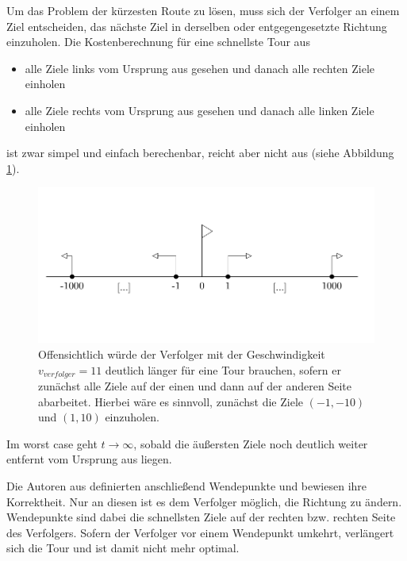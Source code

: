 \documentclass[german,version-2019-11]{uzl-thesis}
\begin{document}
Um das Problem der kürzesten Route zu lösen, muss sich der Verfolger an einem Ziel entscheiden, das nächste Ziel in derselben oder entgegengesetzte Richtung einzuholen. Die Kostenberechnung für eine schnellste Tour aus
\begin{itemize}
\item alle Ziele links vom Ursprung aus gesehen und danach alle rechten Ziele einholen
\item alle Ziele rechts vom Ursprung aus gesehen und danach alle linken Ziele einholen
\end{itemize} 
ist zwar simpel und einfach berechenbar, reicht aber nicht aus (siehe Abbildung \ref{fig:GegenBsp1Dim}).
\begin{figure}[htbp]
\centering
\includegraphics[scale=0.68]{../Grafiken/Verwendete/1DGegenbsp.PNG}
\caption{Offensichtlich würde der Verfolger mit der Geschwindigkeit $v_{verfolger}=11$ deutlich länger für eine Tour brauchen, sofern er zunächst alle Ziele auf der einen und dann auf der anderen Seite abarbeitet. Hierbei wäre es sinnvoll, zunächst die Ziele $(-1,-10)$ und $(1,10)$ einzuholen.}
\label{fig:GegenBsp1Dim}
\end{figure}
Im worst case geht $t\rightarrow\infty$, sobald die äußersten Ziele noch deutlich weiter entfernt vom Ursprung aus liegen. 

Die Autoren aus \cite{helvig} definierten anschließend Wendepunkte und bewiesen ihre Korrektheit. Nur an diesen ist es dem Verfolger möglich, die Richtung zu ändern. Wendepunkte sind dabei die schnellsten Ziele auf der rechten bzw. rechten Seite des Verfolgers. Sofern der Verfolger vor einem Wendepunkt umkehrt, verlängert sich die Tour und ist damit nicht mehr optimal.
\end{document}

